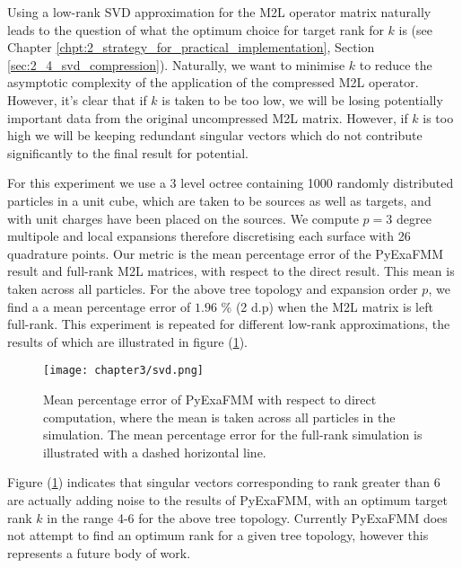 Using a low-rank \gls{SVD} approximation for the \gls{M2L} operator matrix
naturally leads to the question of what the optimum choice for target rank for $k$
is (see Chapter \ref{chpt:2_strategy_for_practical_implementation}, Section \ref{sec:2_4_svd_compression}).
Naturally, we want to minimise $k$ to reduce the asymptotic complexity of
the application of the compressed \gls{M2L} operator. However, it's clear that
if $k$ is taken to be too low, we will be losing potentially important data
from the original uncompressed \gls{M2L} matrix. However, if $k$ is too high
we will be keeping redundant singular vectors which do not contribute significantly
to the final result for potential.

For this experiment we use a 3 level octree containing 1000 randomly distributed
particles in a unit cube, which are taken to be sources as well as targets, and
with unit charges have been placed on the sources. We compute $p=3$ degree multipole and
local expansions therefore discretising each surface with 26 quadrature points.
Our metric is the mean percentage error of the \gls{PyExaFMM} result and
full-rank \gls{M2L} matrices, with respect to the direct result.
This mean is taken across all particles. For the above
tree topology and expansion order $p$, we find a a mean percentage error of
$1.96$ \% (2 d.p) when the \gls{M2L} matrix is left full-rank.
This experiment is repeated for different low-rank approximations,
the results of which are illustrated in figure (\ref{fig:3_2_svd}).

\begin{figure}[ht]
    \centering

  {\texttt{[image: chapter3/svd.png]}}
  \vspace{0pt}
    \caption{Mean percentage error of \gls{PyExaFMM} with respect to direct
    computation, where the mean is taken across all particles in the simulation.
    The mean percentage error for the full-rank simulation is illustrated with
    a dashed horizontal line.
    }
    \label{fig:3_2_svd}
\end{figure}

Figure (\ref{fig:3_2_svd}) indicates that singular vectors corresponding to rank
greater than 6 are actually adding noise to the results of \gls{PyExaFMM}, with
an optimum target rank $k$ in the range 4-6 for the above tree topology. Currently
\gls{PyExaFMM} does not attempt to find an optimum rank for a given tree topology,
however this represents a future body of work.
